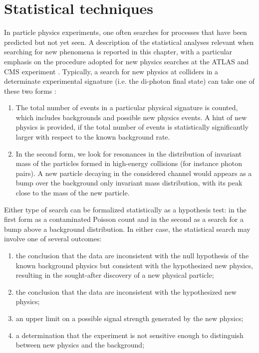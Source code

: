 \documentclass[a4paper, oneside, 11pt, openright]{book}
\begin{document}
	\chapter{Statistical techniques}\label{chapter:3}
		In particle physics experiments, one often searches for processes that have been predicted but not yet seen. A description of the statistical analyses relevant when searching for new phenomena is reported in this chapter, with a particular emphasis on the procedure adopted for new physics searches at the ATLAS and CMS experiment \cite{Statistic}. Typically, a search for new physics at colliders in a determinate experimental signature (i.e. the di-photon final state) can take one of these two forms \cite{Higgs_statistic}:
		\begin{enumerate}
			\item The total number of events in a particular physical signature is counted, which includes backgrounds and possible new physics events. A hint of new physics is provided, if the total number of events is statistically significantly larger with respect to the known background rate.
			\item In the second form, we look for resonances in the distribution of invariant mass of the particles formed in high-energy collisions (for instance photon pairs). A new particle decaying in the considered channel would appears as a bump over the background only invariant mass distribution, with its peak close to the mass of the new particle.
			
		\end{enumerate}
		Either type of search can be formalized statistically as a hypothesis test: in the first form as a contaminated Poisson count and in the second as a search for a bump above a background distribution. In either case, the statistical search may involve one of several outcomes:
		\begin{enumerate}
			\item the conclusion that the data are inconsistent with the null hypothesis of the known background physics but consistent with the hypothesized new physics, resulting in the sought-after discovery of a new physical particle;
			\item the conclusion that the data are inconsistent with the hypothesized new physics;
			\item an upper limit on a possible signal strength generated by the new physics;
			\item a determination that the experiment is not sensitive enough to distinguish between new physics and the background;
		\end{enumerate}
	
\end{document}
